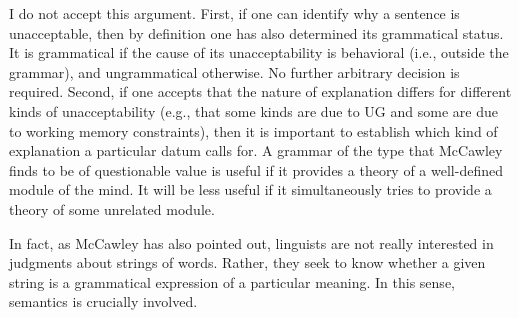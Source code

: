 \noindent
I do not accept this argument. First, if one can identify why a sentence is unacceptable, then by definition one has also determined its grammatical status. It is grammatical if the cause of its unacceptability is behavioral (i.e., outside the grammar), and ungrammatical otherwise. No further arbitrary decision is required. Second, if one accepts that the nature of explanation differs for different kinds of unacceptability (e.g., that some kinds are due to UG and some are due to working memory constraints), then it is important to establish which kind of explanation a particular datum calls for. A grammar of the type that McCawley finds to be of questionable value is useful if it provides a theory of a well-defined module of the mind. It will be less useful if it simultaneously tries to provide a theory of some unrelated module.

In fact, as McCawley has also pointed out, linguists are not really interested
in judgments about strings of words. Rather, they seek to know whether a given string is a grammatical expression of a particular meaning. In this sense, semantics is crucially involved.

